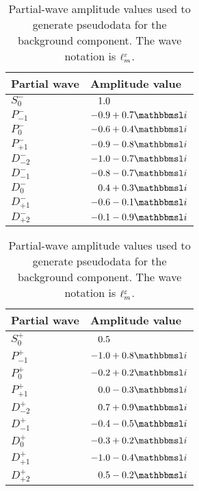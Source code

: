 \begin{table}[tbp]
  \centering%
  \renewcommand{\arraystretch}{1.2}%
  \caption{Partial-wave amplitude values used to generate pseudodata
  for the background component.  The wave notation is
  $\ell_m^\varepsilon$.}%
  \label{tab:photoprod_study_waveset_bkg}%
  \vspace*{1ex}%
  \hfill%
  \begin{tabular}{ll}
    \toprule
    \textbf{Partial wave} &
    \textbf{Amplitude value} \\
    \midrule
    $S_0^-$    & $\hphantom{-}1.0$ \\
    $P_{-1}^-$ & $-0.9 + 0.7 \imag$ \\
    $P_0^-$    & $-0.6 + 0.4 \imag$ \\
    $P_{+1}^-$ & $-0.9 - 0.8 \imag$ \\
    $D_{-2}^-$ & $-1.0 - 0.7 \imag$ \\
    $D_{-1}^-$ & $-0.8 - 0.7 \imag$ \\
    $D_0^-$    & $\hphantom{-}0.4 + 0.3 \imag$ \\
    $D_{+1}^-$ & $-0.6 - 0.1 \imag$ \\
    $D_{+2}^-$ & $-0.1 - 0.9 \imag$ \\
    \bottomrule
  \end{tabular}
  \hfill%
  \begin{tabular}{ll}
    \toprule
    \textbf{Partial wave} &
    \textbf{Amplitude value} \\
    \midrule
    $S_0^+$    & $\hphantom{-}0.5$ \\
    $P_{-1}^+$ & $-1.0 + 0.8 \imag$ \\
    $P_0^+$    & $-0.2 + 0.2 \imag$ \\
    $P_{+1}^+$ & $\hphantom{-}0.0 - 0.3 \imag$ \\
    $D_{-2}^+$ & $\hphantom{-}0.7 + 0.9 \imag$ \\
    $D_{-1}^+$ & $-0.4 - 0.5 \imag$ \\
    $D_0^+$    & $-0.3 + 0.2 \imag$ \\
    $D_{+1}^+$ & $-1.0 - 0.4 \imag$ \\
    $D_{+2}^+$ & $\hphantom{-}0.5 - 0.2 \imag$ \\
    \bottomrule
  \end{tabular}
  \hfill\null%
\end{table}

